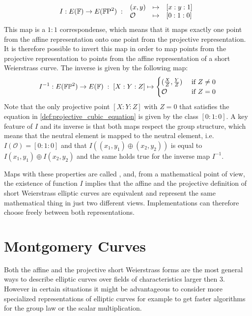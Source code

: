 \begin{equation}\label{eq:weierstrass-isomorphism-map}
I : E(\mathbb{F}) \to E(\mathbb{F}\mathrm{P}^2)\;:\;
\begin{array}{lcl}
(x,y)       &\mapsto & [x:y:1]\\
\mathcal{O} &\mapsto & [0:1:0]
\end{array}
\end{equation}
This map is a $1:1$ correspondense, which means that it maps exactly one point from the affine representation onto one point from the projective representation. It is therefore possible to invert this map in order to map points from the projective representation to points from the affine representation of a short Weierstrass curve. The inverse is given by the following map:
\begin{equation}
I^{-1} : E(\mathbb{F}\mathbb{P}^2)\to E(\mathbb{F}) \;:\; [X:Y:Z] \mapsto \begin{cases}
(\frac{X}{Z},\frac{Y}{Z}) & \text{ if } Z\neq 0\\
\mathcal{O} & \text{ if } Z=0
\end{cases}
\end{equation}
Note that the only projective point $[X:Y:Z]$ with $Z = 0$ that satisfies the equation in \ref{def:projective_cubic_equation} is given by the class $[0:1:0]$. A key feature of $I$ and its inverse is that both maps respect the group structure, which means that the neutral element is mapped to the neutral element, i.e. $I(\mathcal{O})=[0:1:0]$ and that  $I((x_1,y_1)\oplus (x_2,y_2))$ is equal to $I(x_1,y_1)\oplus I(x_2,y_2)$ and the same holds true for the inverse map $I^{-1}$.

Maps with these properties are called , and, from a mathematical point of view, the existence of function $I$ implies that the affine and the projective definition of short Weierstrass elliptic curves are equivalent and represent the same mathematical thing in just two different views. Implementations can therefore choose freely between both representations. 


\section{Montgomery Curves}\label{sec:montgomery}
Both the affine and the projective short Weierstrass forms are the most general ways to describe elliptic curves over fields of characteristics larger then $3$. However in certain situations it might be advantageous to consider more specialized representations of elliptic curves for example to get faster algorithms for the group law or the scalar multiplication. 


